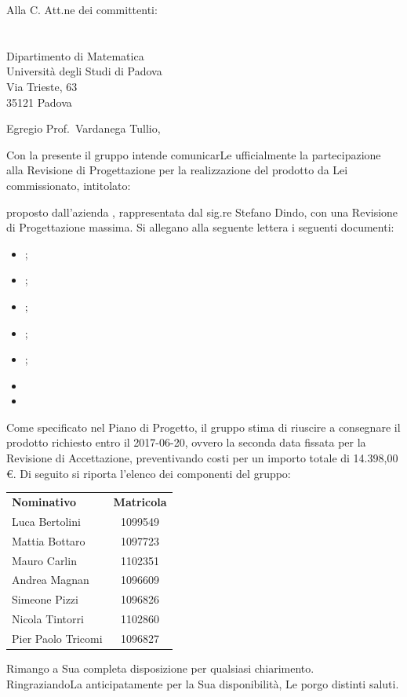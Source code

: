 \documentclass[a4paper,12pt]{letteracdp}
\date{2017-04-10}
\begin{document}
  \begin{letter}{
    Alla C. Att.ne dei committenti: \\
    \COMMITTENTE \\
    \CARDIN      \\
    Dipartimento di Matematica \\
		Università degli Studi di Padova \\
		Via Trieste, 63 \\
		35121 Padova}
		
    \opening{Egregio Prof.~Vardanega Tullio,}
    Con la presente il gruppo \GRUPPO{} intende comunicarLe ufficialmente la partecipazione alla Revisione di Progettazione per la realizzazione del prodotto da Lei commissionato, intitolato:
    \begin{center}
      \CAPITOLATO
    \end{center}
    proposto dall'azienda \PROPONENTE{}, rappresentata dal sig.re Stefano Dindo, con una Revisione di Progettazione
	massima.
    Si allegano alla seguente lettera i seguenti documenti:
    \begin{itemize}
      \item \Gldoc{} \Glfile{};
      \item \NPdoc{} \NPfile{};
      \item \PPdoc{} \PPfile{};
      \item \PQdoc{} \PQfile{};
      \item \ARdoc{} \ARfile{};
      \item {} 
      \item {} 
    \end{itemize}
    Come specificato nel Piano di Progetto, il gruppo stima di riuscire a
    consegnare il prodotto richiesto entro il 2017-06-20, ovvero la seconda data
    fissata per la Revisione di Accettazione, preventivando costi per un importo
    totale di 14.398,00 \euro.
    \newpage
    Di seguito si riporta l'elenco dei componenti del gruppo:\\
    \begin{center}
      \begin{tabular}{l c}
        \textbf{Nominativo} & \textbf{Matricola} \\
        Luca Bertolini 	 	& 1099549  \\
        Mattia Bottaro 	 	& 1097723  \\
        Mauro Carlin 	 	& 1102351  \\
        Andrea Magnan    	& 1096609  \\
        Simeone Pizzi    	& 1096826  \\
        Nicola Tintorri    	& 1102860  \\
        Pier Paolo Tricomi 	& 1096827  \\
      \end{tabular}
    \end{center}
    \closing{Rimango a Sua completa disposizione per qualsiasi chiarimento. \\
	RingraziandoLa anticipatamente per la Sua disponibilità, Le porgo distinti saluti.}
  \end{letter}
\end{document}
